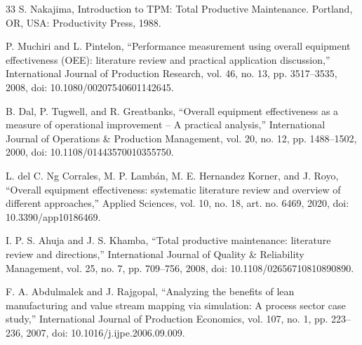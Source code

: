 \documentclass[12pt,a4paper]{article}
\begin{document}
\begin{thebibliography}{33}
S. Nakajima, Introduction to TPM: Total Productive Maintenance. Portland, OR, USA: Productivity Press, 1988.

P. Muchiri and L. Pintelon, ``Performance measurement using overall equipment effectiveness (OEE): literature review and practical application discussion,'' International Journal of Production Research, vol. 46, no. 13, pp. 3517--3535, 2008, doi: 10.1080/00207540601142645.

B. Dal, P. Tugwell, and R. Greatbanks, ``Overall equipment effectiveness as a measure of operational improvement -- A practical analysis,'' International Journal of Operations \& Production Management, vol. 20, no. 12, pp. 1488--1502, 2000, doi: 10.1108/01443570010355750.

L. del C. Ng Corrales, M. P. Lamb\'an, M. E. Hernandez Korner, and J. Royo, ``Overall equipment effectiveness: systematic literature review and overview of different approaches,'' Applied Sciences, vol. 10, no. 18, art. no. 6469, 2020, doi: 10.3390/app10186469.

I. P. S. Ahuja and J. S. Khamba, ``Total productive maintenance: literature review and directions,'' International Journal of Quality \& Reliability Management, vol. 25, no. 7, pp. 709--756, 2008, doi: 10.1108/02656710810890890.

F. A. Abdulmalek and J. Rajgopal, ``Analyzing the benefits of lean manufacturing and value stream mapping via simulation: A process sector case study,'' International Journal of Production Economics, vol. 107, no. 1, pp. 223--236, 2007, doi: 10.1016/j.ijpe.2006.09.009.

\end{thebibliography}
\end{document}
